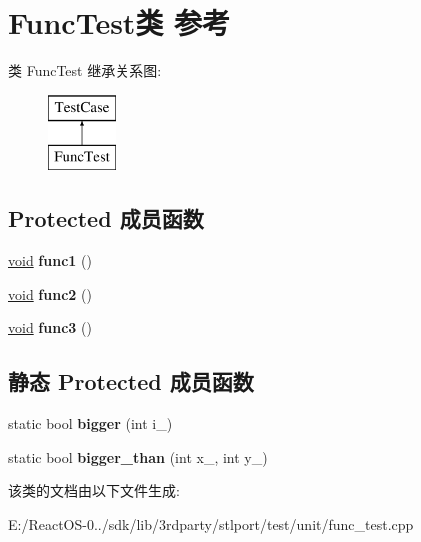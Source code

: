 \hypertarget{class_func_test}{}\section{Func\+Test类 参考}
\label{class_func_test}
类 Func\+Test 继承关系图\+:\begin{figure}[H]
\begin{center}
\leavevmode
\includegraphics[height=2.000000cm]{class_func_test}
\end{center}
\end{figure}
\subsection*{Protected 成员函数}
\begin{DoxyCompactItemize}
\item 
\mbox{\label{class_func_test_a8a36e4f6e48e9b78a520d94aa61abb48}} 
\hyperlink{interfacevoid}{void} {\bfseries func1} ()
\item 
\mbox{\label{class_func_test_a2d950d4d4d048ef61e304879f11c45db}} 
\hyperlink{interfacevoid}{void} {\bfseries func2} ()
\item 
\mbox{\label{class_func_test_ad5b9e278e80125ec10b6d3d835d740a1}} 
\hyperlink{interfacevoid}{void} {\bfseries func3} ()
\end{DoxyCompactItemize}
\subsection*{静态 Protected 成员函数}
\begin{DoxyCompactItemize}
\item 
\mbox{\label{class_func_test_a57ae6d0fd53b59105d6f3d2c042ca7d7}} 
static bool {\bfseries bigger} (int i\+\_\+)
\item 
\mbox{\label{class_func_test_abd18ebfd513d48da56a45d0e6687a2cb}} 
static bool {\bfseries bigger\+\_\+than} (int x\+\_\+, int y\+\_\+)
\end{DoxyCompactItemize}


该类的文档由以下文件生成\+:\begin{DoxyCompactItemize}
\item 
E\+:/\+React\+O\+S-\/0../sdk/lib/3rdparty/stlport/test/unit/func\+\_\+test.\+cpp\end{DoxyCompactItemize}
